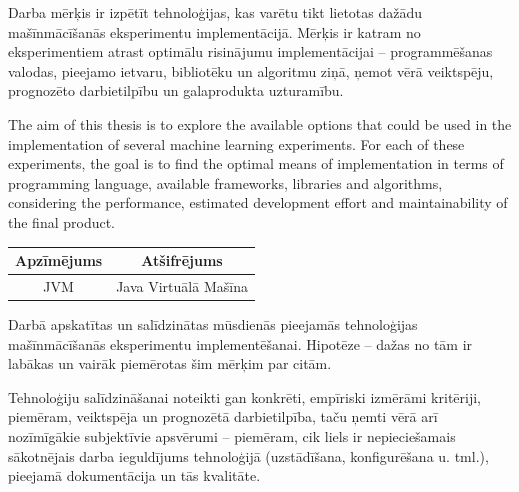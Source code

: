 \documentclass{ludis}
\begin{document}
\maketitle

\begin{abstract-lv}
  Darba mērķis ir izpētīt tehnoloģijas, kas varētu tikt lietotas dažādu mašīnmācīšanās eksperimentu implementācijā. Mērķis ir katram no eksperimentiem atrast optimālu risinājumu implementācijai -- programmēšanas valodas, pieejamo ietvaru, bibliotēku un algoritmu ziņā, ņemot vērā veiktspēju, prognozēto darbietilpību un galaprodukta uzturamību.
\end{abstract-lv}

\begin{abstract-en}
  The aim of this thesis is to explore the available options that could be used in the implementation of several machine learning experiments. For each of these experiments, the goal is to find the optimal means of implementation in terms of programming language, available frameworks, libraries and algorithms, considering the performance, estimated development effort and maintainability of the final product.
\end{abstract-en}

\tableofcontents

\setlength\LTleft{0pt}
\setlength\LTright{0pt}
\begin{longtable}{| c | c |}
  \hline
  \textbf{Apzīmējums} & \textbf{Atšifrējums}\\ 
  \endhead

  \hline
  JVM & Java Virtuālā Mašīna\\
  \hline
\end{longtable}

Darbā apskatītas un salīdzinātas mūsdienās pieejamās tehnoloģijas mašīnmācīšanās eksperimentu implementēšanai. Hipotēze -- dažas no tām ir labākas un vairāk piemērotas šim mērķim par citām.

Tehnoloģiju salīdzināšanai noteikti gan konkrēti, empīriski izmērāmi kritēriji, piemēram, veiktspēja un prognozētā darbietilpība, taču ņemti vērā arī nozīmīgākie subjektīvie apsvērumi -- piemēram, cik liels ir nepieciešamais sākotnējais darba ieguldījums tehnoloģijā (uzstādīšana, konfigurēšana u. tml.), pieejamā dokumentācija un tās kvalitāte.
\end{document}
